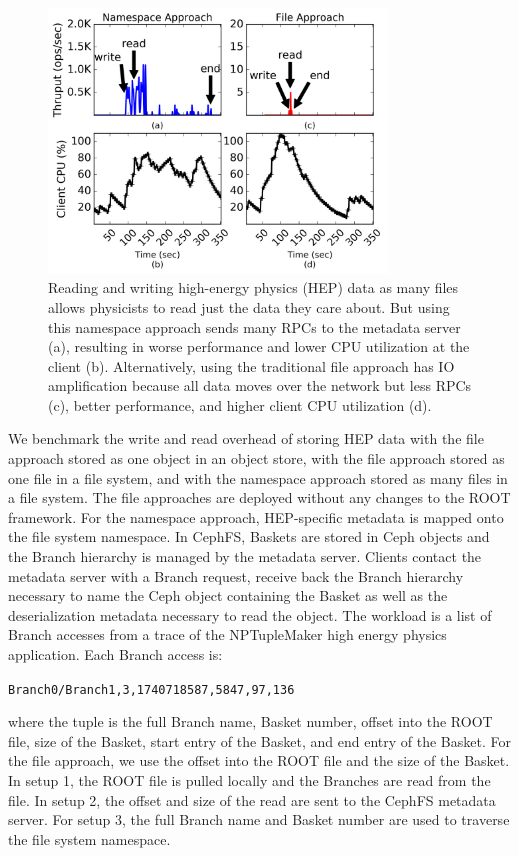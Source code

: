 \begin{figure}[t]
  \centering
  \includegraphics[width=90mm]{figures/hep_problem.png}
  \caption{Reading and writing high-energy physics (HEP) data as many files
allows physicists to read just the data they care about. But using this
namespace approach sends many RPCs to the metadata server (a), resulting in
worse performance and lower CPU utilization at the client (b). Alternatively,
using the traditional file approach has IO amplification because all data moves
over the network but less RPCs (c), better performance, and higher client CPU
utilization (d).}
  \label{fig:hep_problem}
\end{figure}

We benchmark the write and read overhead of storing HEP data with the file
approach stored as one object in an object store, with the file approach stored
as one file in a file system, and with the namespace approach stored as many
files in a file system.  The file approaches are deployed without any changes
to the ROOT framework. For the namespace approach, HEP-specific metadata is
mapped onto the file system namespace. In CephFS, Baskets are stored in Ceph
objects and the Branch hierarchy is managed by the metadata server.  Clients
contact the metadata server with a Branch request, receive back the Branch
hierarchy necessary to name the Ceph object containing the Basket as well as
the deserialization metadata necessary to read the object.  The workload is a
list of Branch accesses from a trace of the NPTupleMaker high energy physics
application. Each Branch access is:

\texttt{Branch0/Branch1,3,1740718587,5847,97,136}

where the tuple is the full Branch name, Basket number, offset into the ROOT
file, size of the Basket, start entry of the Basket, and end entry of the
Basket.  For the file approach, we use the offset into the ROOT file and the
size of the Basket.  In setup 1, the ROOT file is pulled locally and the
Branches are read from the file. In setup 2, the offset and size of the read
are sent to the CephFS metadata server.  For setup 3, the full Branch name and
Basket number are used to traverse the file system namespace.

